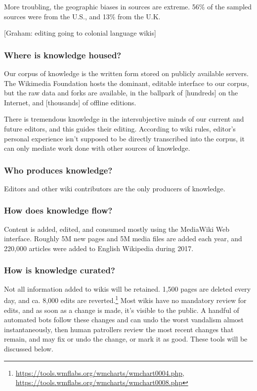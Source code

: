 \documentclass[format=sigconf, authorversion]{acmart}
\begin{document}
More troubling, the geographic biases in sources are extreme.  56\% of the sampled sources were from the U.S., and 13\% from the U.K.

[Graham: editing going to colonial language wikis]

\subsubsection{Where is knowledge housed?}

Our corpus of knowledge is the written form stored on publicly available servers.  The Wikimedia Foundation hosts the dominant, editable interface to our corpus, but the raw data and forks are available, in the ballpark of [hundreds] on the Internet, and [thousands] of offline editions.

There is tremendous knowledge in the intersubjective minds of our current and future editors, and this guides their editing.  According to wiki rules, editor's personal experience isn't supposed to be directly transcribed into the corpus, it can only mediate work done with other sources of knowledge.

\subsubsection{Who produces knowledge?}

Editors and other wiki contributors are the only producers of knowledge.

\subsubsection{How does knowledge flow?}

Content is added, edited, and consumed mostly using the MediaWiki Web interface.  Roughly 5M new pages and 5M media files are added each year, and 220,000 articles were added to English Wikipedia during 2017.

\subsubsection{How is knowledge curated?}

Not all information added to wikis will be retained.  1,500 pages are deleted every day, and ca. 8,000 edits are reverted.\footnote{\url{https://tools.wmflabs.org/wmcharts/wmchart0004.php}, \url{https://tools.wmflabs.org/wmcharts/wmchart0008.php}}  Most wikis have no mandatory review for edits, and as soon as a change is made, it's visible to the public.  A handful of automated bots follow these changes and can undo the worst vandalism almost instantaneously, then human patrollers review the most recent changes that remain, and may fix or undo the change, or mark it as good.  These tools will be discussed below.
\end{document}
